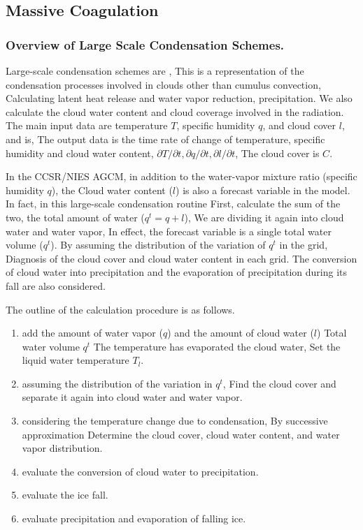 \hypertarget{massive-coagulation}{%
\subsection{Massive Coagulation}\label{massive-coagulation}}

\hypertarget{overview-of-large-scale-condensation-schemes.}{%
\subsubsection{Overview of Large Scale Condensation
Schemes.}\label{overview-of-large-scale-condensation-schemes.}}

Large-scale condensation schemes are , This is a representation of the
condensation processes involved in clouds other than cumulus convection,
Calculating latent heat release and water vapor reduction,
precipitation. We also calculate the cloud water content and cloud
coverage involved in the radiation. The main input data are temperature
\(T\), specific humidity \(q\), and cloud cover \(l\), and is, The
output data is the time rate of change of temperature, specific humidity
and cloud water content,
\(\partial T/\partial t, \partial q/\partial t, \partial l/\partial t\),
The cloud cover is \(C\).

In the CCSR/NIES AGCM, in addition to the water-vapor mixture ratio
(specific humidity \(q\)), the Cloud water content (\(l\)) is also a
forecast variable in the model. In fact, in this large-scale
condensation routine First, calculate the sum of the two, the total
amount of water (\(q^t = q+l\)), We are dividing it again into cloud
water and water vapor, In effect, the forecast variable is a single
total water volume (\(q^t\)). By assuming the distribution of the
variation of \(q^t\) in the grid, Diagnosis of the cloud cover and cloud
water content in each grid. The conversion of cloud water into
precipitation and the evaporation of precipitation during its fall are
also considered.

The outline of the calculation procedure is as follows.

\begin{enumerate}
\def\labelenumi{\arabic{enumi}.}
\item
  add the amount of water vapor (\(q\)) and the amount of cloud water
  (\(l\)) Total water volume \(q^t\) The temperature has evaporated the
  cloud water, Set the liquid water temperature \(T_l\).
\item
  assuming the distribution of the variation in \(q^t\), Find the cloud
  cover and separate it again into cloud water and water vapor.
\item
  considering the temperature change due to condensation, By successive
  approximation Determine the cloud cover, cloud water content, and
  water vapor distribution.
\item
  evaluate the conversion of cloud water to precipitation.
\item
  evaluate the ice fall.
\item
  evaluate precipitation and evaporation of falling ice.
\end{enumerate}

